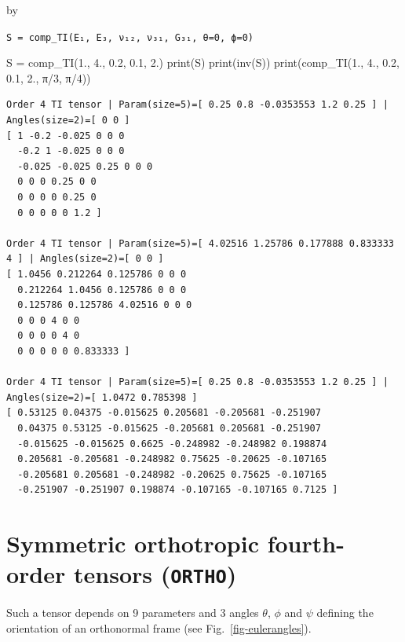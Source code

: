 \documentclass[
  letterpaper,
  DIV=11,
  numbers=noendperiod]{scrreprt}
\newenvironment{Shaded}{\begin{snugshade}}{\end{snugshade}}
\newcommand{\BuiltInTok}[1]{\textcolor[rgb]{0.00,0.23,0.31}{#1}}
\newcommand{\DecValTok}[1]{\textcolor[rgb]{0.68,0.00,0.00}{#1}}
\newcommand{\FloatTok}[1]{\textcolor[rgb]{0.68,0.00,0.00}{#1}}
\newcommand{\NormalTok}[1]{\textcolor[rgb]{0.00,0.23,0.31}{#1}}
\newcommand{\OperatorTok}[1]{\textcolor[rgb]{0.37,0.37,0.37}{#1}}
\begin{document}
by

\texttt{S\ =\ comp\_TI(E₁,\ E₃,\ ν₁₂,\ ν₃₁,\ G₃₁,\ θ=0,\ ϕ=0)}

\begin{Shaded}
\begin{Highlighting}[]
\NormalTok{S }\OperatorTok{=}\NormalTok{ comp\_TI(}\FloatTok{1.}\NormalTok{, }\FloatTok{4.}\NormalTok{, }\FloatTok{0.2}\NormalTok{, }\FloatTok{0.1}\NormalTok{, }\FloatTok{2.}\NormalTok{)}
\BuiltInTok{print}\NormalTok{(S)}
\BuiltInTok{print}\NormalTok{(inv(S))}
\BuiltInTok{print}\NormalTok{(comp\_TI(}\FloatTok{1.}\NormalTok{, }\FloatTok{4.}\NormalTok{, }\FloatTok{0.2}\NormalTok{, }\FloatTok{0.1}\NormalTok{, }\FloatTok{2.}\NormalTok{, π}\OperatorTok{/}\DecValTok{3}\NormalTok{, π}\OperatorTok{/}\DecValTok{4}\NormalTok{))}
\end{Highlighting}
\end{Shaded}

\begin{verbatim}
Order 4 TI tensor | Param(size=5)=[ 0.25 0.8 -0.0353553 1.2 0.25 ] | Angles(size=2)=[ 0 0 ]
[ 1 -0.2 -0.025 0 0 0 
  -0.2 1 -0.025 0 0 0 
  -0.025 -0.025 0.25 0 0 0 
  0 0 0 0.25 0 0 
  0 0 0 0 0.25 0 
  0 0 0 0 0 1.2 ]

Order 4 TI tensor | Param(size=5)=[ 4.02516 1.25786 0.177888 0.833333 4 ] | Angles(size=2)=[ 0 0 ]
[ 1.0456 0.212264 0.125786 0 0 0 
  0.212264 1.0456 0.125786 0 0 0 
  0.125786 0.125786 4.02516 0 0 0 
  0 0 0 4 0 0 
  0 0 0 0 4 0 
  0 0 0 0 0 0.833333 ]

Order 4 TI tensor | Param(size=5)=[ 0.25 0.8 -0.0353553 1.2 0.25 ] | Angles(size=2)=[ 1.0472 0.785398 ]
[ 0.53125 0.04375 -0.015625 0.205681 -0.205681 -0.251907 
  0.04375 0.53125 -0.015625 -0.205681 0.205681 -0.251907 
  -0.015625 -0.015625 0.6625 -0.248982 -0.248982 0.198874 
  0.205681 -0.205681 -0.248982 0.75625 -0.20625 -0.107165 
  -0.205681 0.205681 -0.248982 -0.20625 0.75625 -0.107165 
  -0.251907 -0.251907 0.198874 -0.107165 -0.107165 0.7125 ]
\end{verbatim}

\section{\texorpdfstring{Symmetric orthotropic fourth-order tensors
(\texttt{ORTHO})}{Symmetric orthotropic fourth-order tensors (ORTHO)}}\label{symmetric-orthotropic-fourth-order-tensors-ortho}

Such a tensor depends on 9 parameters and 3 angles \(\theta\), \(\phi\)
and \(\psi\) defining the orientation of an orthonormal frame (see
Fig.~\ref{fig-eulerangles}).
\end{document}
